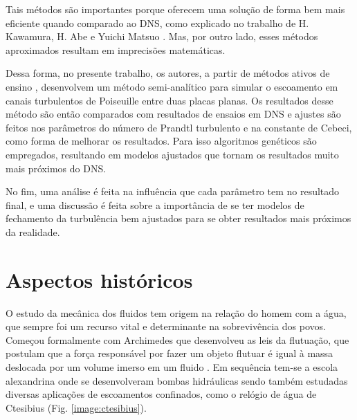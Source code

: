 Tais métodos são importantes porque oferecem uma solução de forma bem mais eficiente quando comparado ao DNS, como explicado no trabalho de H. Kawamura, H. Abe e Yuichi Matsuo \cite{Abe}. Mas, por outro lado, esses métodos aproximados resultam em imprecisões matemáticas.

Dessa forma, no presente trabalho, os autores, a partir de métodos ativos de ensino \cite{CFD_in_learing}, desenvolvem um método semi-analítico para simular o escoamento em canais turbulentos de Poiseuille \cite{Poiseuille} entre duas placas planas. Os resultados desse método são então comparados com resultados de ensaios em DNS e ajustes são feitos nos parâmetros do número de Prandtl turbulento e na constante de Cebeci, como forma de melhorar os resultados. Para isso algoritmos genéticos são empregados, resultando em modelos ajustados que tornam os resultados muito mais próximos do DNS.

No fim, uma análise é feita na influência que cada parâmetro tem no resultado final, e uma discussão é feita sobre a importância de se ter modelos de fechamento da turbulência bem ajustados para se obter resultados mais próximos da realidade.

\section{Aspectos históricos}

O estudo da mecânica dos fluidos tem origem na relação do homem com a água, que sempre foi um recurso vital e determinante na sobrevivência dos povos. Começou formalmente com Archimedes que desenvolveu as leis da flutuação, que postulam que a força responsável por fazer um objeto flutuar é igual à massa deslocada por um volume imerso em um fluido \cite{dijksterhuis2014archimedes}. Em sequência tem-se a escola alexandrina onde se desenvolveram bombas hidráulicas sendo também estudadas diversas aplicações de escoamentos confinados, como o relógio de água de Ctesibius (Fig. \ref{image:ctesibius}).

